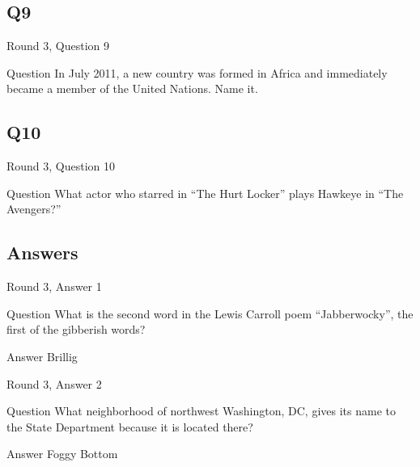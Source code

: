 \documentclass[11pt]{beamer}
\begin{document}
\subsection*{Q9}
\begin{frame}[t]{Round 3, Question 9}
\vspace{2em}
\begin{block}{Question}
In July 2011, a new country was formed in Africa and immediately became a member of the United Nations. Name it.
\end{block}
\end{frame}
    

\subsection*{Q10}
\begin{frame}[t]{Round 3, Question 10}
\vspace{2em}
\begin{block}{Question}
What actor who starred in ``The Hurt Locker'' plays Hawkeye in ``The Avengers?''
\end{block}
\end{frame}
    
\subsection{Answers}

\begin{frame}[t]{Round 3, Answer 1}
\vspace{2em}
\begin{block}{Question}
What is the second word in the Lewis Carroll poem ``Jabberwocky'', the first of the gibberish words\@?
\end{block}
\pause{}
\begin{block}{Answer}
Brillig
\end{block}
\end{frame}
    

\begin{frame}[t]{Round 3, Answer 2}
\vspace{2em}
\begin{block}{Question}
What neighborhood of northwest Washington, DC, gives its name to the State Department because it is located there\@?
\end{block}
\pause{}
\begin{block}{Answer}
Foggy Bottom
\end{block}
\end{frame}
    
\end{document}
